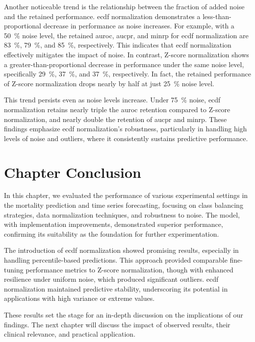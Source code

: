 Another noticeable trend is the relationship between the fraction of added noise and the retained performance. \gls{ecdf} normalization demonstrates a less-than-proportional decrease in performance as noise increases. For example, with a \qty{50}{\percent} noise level, the retained \gls{auroc}, \gls{aucpr}, and \gls{minrp} for \gls{ecdf} normalization are \qty{83}{\percent}, \qty{79}{\percent}, and \qty{85}{\percent}, respectively. This indicates that \gls{ecdf} normalization effectively mitigates the impact of noise. In contrast, Z-score normalization shows a greater-than-proportional decrease in performance under the same noise level, specifically \qty{29}{\percent}, \qty{37}{\percent}, and \qty{37}{\percent}, respectively. In fact, the retained performance of Z-score normalization drops nearly by half at just \qty{25}{\percent} noise level.

This trend persists even as noise levels increase. Under \qty{75}{\percent} noise, \gls{ecdf} normalization retains nearly triple the \gls{auroc} retention compared to Z-score normalization, and nearly double the retention of \gls{aucpr} and \gls{minrp}. These findings emphasize \gls{ecdf} normalization's robustness, particularly in handling high levels of noise and outliers, where it consistently sustains predictive performance.


\section{Chapter Conclusion}

In this chapter, we evaluated the performance of various experimental settings in the mortality prediction and time series forecasting, focusing on class balancing strategies, data normalization techniques, and robustness to noise. The  model, with implementation improvements, demonstrated superior performance, confirming its suitability as the foundation for further experimentation.

The introduction of \gls{ecdf} normalization showed promising results, especially in handling percentile-based predictions. This approach provided comparable fine-tuning performance metrics to Z-score normalization, though with enhanced resilience under uniform noise, which produced significant outliers. \gls{ecdf} normalization maintained predictive stability, underscoring its potential in applications with high variance or extreme values.

These results set the stage for an in-depth discussion on the implications of our findings. The next chapter will discuss the impact of observed results, their clinical relevance, and practical application.
